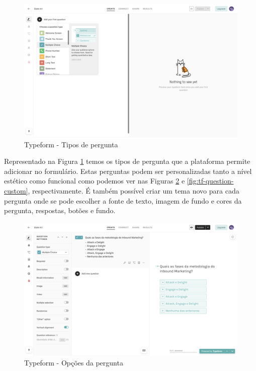 \begin{figure}[ht!]
	\begin{center}
		\includegraphics[width=1\textwidth]{img/tf/tf-question-type}
		\caption{Typeform - Tipos de pergunta}
		\label{fig:tf-question-type}
	\end{center}
\end{figure}

Representado na Figura \ref{fig:tf-question-type} temos os tipos de pergunta que a plataforma permite adicionar no formulário. Estas perguntas podem ser personalizadas tanto a nível estético como funcional como podemos ver nas Figuras \ref{fig:tf-question-opcoes} e \ref{fig:tf-question-custom}, respectivamente. É também possível criar um tema novo para cada pergunta onde se pode escolher a fonte de texto, imagem de fundo e cores da pergunta, respostas, botões e fundo.

\begin{figure}[ht!]
	\begin{center}
		\includegraphics[width=1\textwidth]{img/tf/tf-question-opcoes}
		\caption{Typeform - Opções da pergunta}
		\label{fig:tf-question-opcoes}
	\end{center}
\end{figure}

